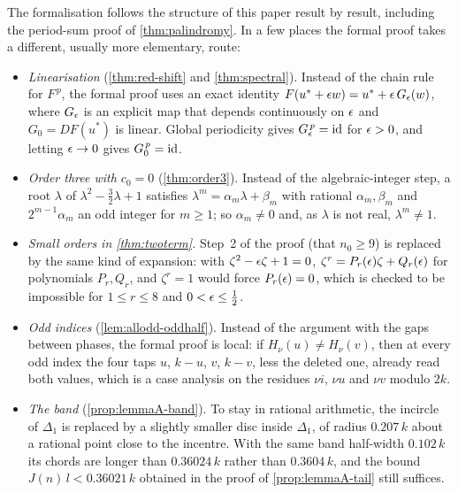 The formalisation follows the structure of this paper result by result,
including the period-sum proof of \autoref{thm:palindromy}. In a few places
the formal proof takes a different, usually more elementary, route:
\begin{itemize}
\item \emph{Linearisation} (\autoref{thm:red-shift} and
\autoref{thm:spectral}). Instead of the chain rule for $F^{\,p}$, the formal
proof uses an exact identity $F(u^*+\epsilon w)=u^*+\epsilon\,G_\epsilon(w)$, where $G_\epsilon$
is an explicit map that depends continuously on $\epsilon$ and $G_0=DF(u^*)$ is
linear. Global periodicity gives $G_\epsilon^{\,p}=\mathrm{id}$ for $\epsilon>0$, and letting
$\epsilon\to0$ gives $G_0^{\,p}=\mathrm{id}$.
\item \emph{Order three with $c_0=0$} (\autoref{thm:order3}). Instead of the
algebraic-integer step, a root $\lambda$ of $\lambda^2-\tfrac32\lambda+1$
satisfies $\lambda^m=\alpha_m\lambda+\beta_m$ with rational $\alpha_m,\beta_m$ and
$2^{m-1}\alpha_m$ an odd integer for $m\ge1$; so $\alpha_m\ne0$ and, as $\lambda$ is not
real, $\lambda^m\ne1$.
\item \emph{Small orders in \autoref{thm:twoterm}.} Step~2 of the proof
(that $n_0\ge9$) is replaced by the same kind of expansion: with
$\zeta^2-\epsilon\zeta+1=0$, $\zeta^r=P_r(\epsilon)\zeta+Q_r(\epsilon)$ for polynomials
$P_r,Q_r$, and $\zeta^r=1$ would force $P_r(\epsilon)=0$, which is checked to be
impossible for $1\le r\le8$ and $0<\epsilon\le\frac12$.
\item \emph{Odd indices} (\autoref{lem:allodd-oddhalf}). Instead of the
argument with the gaps between phases, the formal proof is local: if
$H_\nu(u)\ne H_\nu(v)$, then at every odd index the four taps $u$, $k-u$, $v$,
$k-v$, less the deleted one, already read both values, which is a case
analysis on the residues $\nu i$, $\nu u$ and $\nu v$ modulo $2k$.
\item \emph{The band} (\autoref{prop:lemmaA-band}). To stay in rational
arithmetic, the incircle of $\Delta_1$ is replaced by a slightly smaller
disc inside $\Delta_1$, of radius $0.207\,k$ about a rational point close to
the incentre. With the same band half-width $0.102\,k$ its chords are longer
than $0.36024\,k$ rather than $0.3604\,k$, and the bound $J(n)\,l<0.36021\,k$
obtained in the proof of \autoref{prop:lemmaA-tail} still suffices.
\end{itemize}

